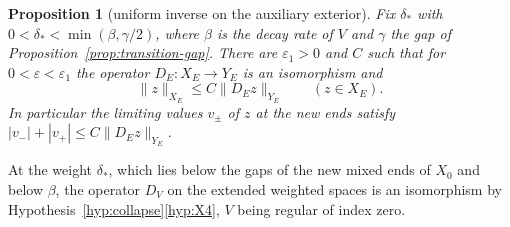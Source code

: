 \documentclass[11pt]{amsart}
\newtheorem{proposition}[theorem]{Proposition}
\theoremstyle{definition}
\theoremstyle{remark}
\theoremstyle{plain}
\numberwithin{equation}{section}
\newcommand{\eps}{\varepsilon}
\begin{document}
\begin{proposition}[uniform inverse on the auxiliary exterior]\label{prop:exterior-inverse}
Fix $\delta_*$ with $0<\delta_*<\min(\beta,\gamma/2)$, where $\beta$ is the decay
rate of $V$ and $\gamma$ the gap of Proposition~\ref{prop:transition-gap}. There
are $\eps_1>0$ and $C$ such that for $0<\eps<\eps_1$ the operator
$D_E\colon X_E\to Y_E$ is an isomorphism and
\[
\|z\|_{X_E}\le C\|D_Ez\|_{Y_E}\qquad(z\in X_E).
\]
In particular the limiting values $v_\pm$ of $z$ at the new ends satisfy
$|v_-|+|v_+|\le C\|D_Ez\|_{Y_E}$.
\end{proposition}

At the weight $\delta_*$, which lies below the gaps of the new mixed ends of $X_0$
and below $\beta$, the operator $D_V$ on the extended weighted spaces is an isomorphism by
Hypothesis~\ref{hyp:collapse}\ref{hyp:X4}, $V$ being regular of index zero.
\end{document}
